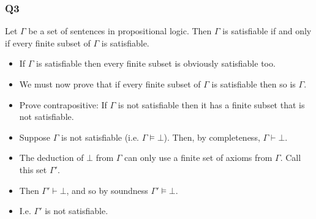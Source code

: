 \documentclass[handout]{beamer}
\begin{document}
\begin{frame}
\frametitle{Q3}
Let $\Gamma$ be a set of sentences in propositional logic. Then $\Gamma$ is satisfiable if and only if every finite subset of $\Gamma$ is satisfiable. 
\vspace{0.5cm}
\begin{itemize}
\item If $\Gamma$ is satisfiable then every finite subset is obviously satisfiable too.
\item We must now prove that if every finite subset of $\Gamma$ is satisfiable then so is $\Gamma$.
\item Prove contrapositive: If $\Gamma$ is not satisfiable then it has a finite subset that is not satisfiable.
\item Suppose $\Gamma$ is not satisfiable (i.e. $\Gamma\models \bot$). Then, by completeness, $\Gamma\vdash \bot$.
\item The deduction of $\bot$ from $\Gamma$ can only use a finite set of axioms from $\Gamma$. Call this set $\Gamma'$.
\item Then $\Gamma'\vdash \bot$, and so by soundness $\Gamma'\models \bot$.
\item I.e. $\Gamma'$ is not satisfiable.
\end{itemize}
\end{frame}
\end{document}
